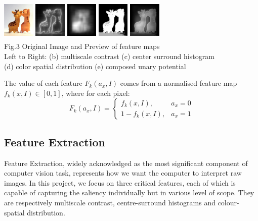 \documentclass[10pt,twocolumn,letterpaper]{article}
\begin{document}
    \begin{center} %
    \includegraphics[width=0.6in,height=0.8in]{./Figures/previews/raw.jpg}
    \includegraphics[width=0.6in,height=0.8in]{./Figures/previews/MC.jpg}
    \includegraphics[width=0.6in,height=0.8in]{./Figures/previews/CSH.jpg} 
    \includegraphics[width=0.6in,height=0.8in]{./Figures/previews/CSD.jpg} 
    \includegraphics[width=0.6in,height=0.8in]{./Figures/previews/Composed.jpg} \\
    {\footnotesize Fig.3 Original Image and Preview of feature maps \\ 
       Left to Right: (b) multiscale contrast  (c) center surround histogram \\[-1mm] 
    (d) color spatial distribution (e) composed unary potential}
    \end{center}


The value of each feature $F_k(a_x,I)$ comes from a normalised feature map $f_k(x,I)\in[0,1]$, where for each pixel: $$F_k(a_x,I) = \left\{\begin{matrix}f_k(x,I), & a_x=0\\1-f_k(x,I), & a_x=1\end{matrix}\right.$$


\subsection{Feature Extraction}
Feature Extraction, widely acknowledged as the most significant component of computer vision task, represents how we want the computer to interpret raw images. In this project, we focus on three critical features, each of which is capable of capturing the saliency individually but in various level of scope. They are respectively multiscale contrast, centre-surround histograms  and colour-spatial distribution. 
\end{document}
